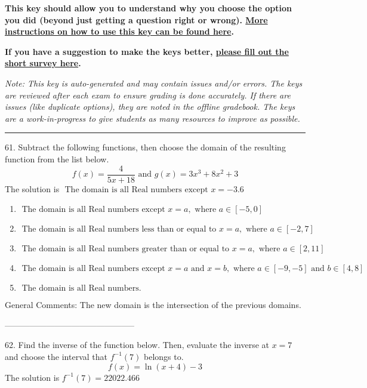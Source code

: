 \documentclass{extbook}[14pt]
\begin{document}
\textbf{This key should allow you to understand why you choose the option you did (beyond just getting a question right or wrong). \href{https://xronos.clas.ufl.edu/mac1105spring2020/courseDescriptionAndMisc/Exams/LearningFromResults}{More instructions on how to use this key can be found here}.}

\textbf{If you have a suggestion to make the keys better, \href{https://forms.gle/CZkbZmPbC9XALEE88}{please fill out the short survey here}.}

\textit{Note: This key is auto-generated and may contain issues and/or errors. The keys are reviewed after each exam to ensure grading is done accurately. If there are issues (like duplicate options), they are noted in the offline gradebook. The keys are a work-in-progress to give students as many resources to improve as possible.}

\rule{\textwidth}{0.4pt}

61. Subtract the following functions, then choose the domain of the resulting function from the list below.
\[ f(x) = \frac{4}{5x+18} \text{ and } g(x) = 3x^{3} +8 x^{2} + 3 \] 
The solution is $ \text{ The domain is all Real numbers except } x = -3.6 $ 

\begin{enumerate}[label=\Alph*.] 
\item $ \text{ The domain is all Real numbers except } x = a, \text{ where } a \in [-5, 0] $ 

  
\item $ \text{ The domain is all Real numbers less than or equal to } x = a, \text{ where } a \in [-2, 7] $ 

  
\item $ \text{ The domain is all Real numbers greater than or equal to } x = a, \text{ where } a \in [2, 11] $ 

  
\item $ \text{ The domain is all Real numbers except } x = a \text{ and } x = b, \text{ where } a \in [-9, -5] \text{ and } b \in [4, 8] $ 

  
\item $ \text{ The domain is all Real numbers. } $ 

  
\end{enumerate} 
 
General Comments: The new domain is the intersection of the previous domains.

-----------------------------------------------

62. Find the inverse of the function below. Then, evaluate the inverse at $x = 7$ and choose the interval that $f^{-1}(7)$ belongs to.
\[ f(x) = \ln{(x+4)}-3 \] 
The solution is $ f^{-1}(7) = 22022.466 $ 
\end{document}
